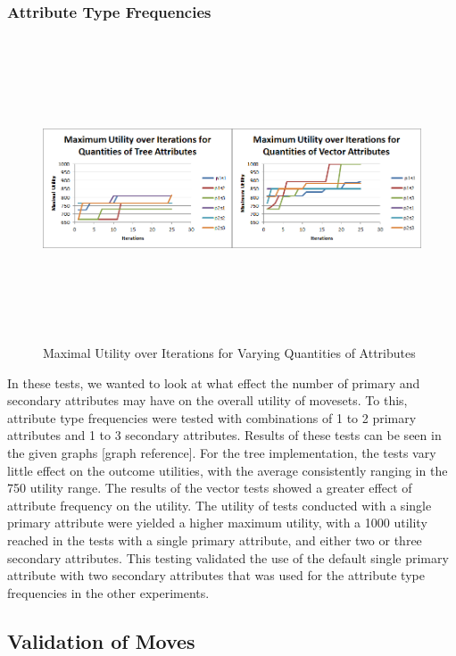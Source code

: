 \documentclass{acm_proc_article-sp}
\begin{document}
    \subsubsection{Attribute Type Frequencies}

\begin{figure}[ht!]
\centering
\includegraphics[width=\textwidth,height=90mm,keepaspectratio]{./images/attr_frquency_comparison.png}
\caption{Maximal Utility over Iterations for Varying Quantities of Attributes}
\label{attribute_frequency_experiments}
\end{figure}

In these tests, we wanted to look at what effect the number of primary and secondary attributes may have on the overall utility of movesets. To this, attribute type frequencies were tested with combinations of 1 to 2 primary attributes and 1 to 3 secondary attributes. Results of these tests can be seen in the given graphs [graph reference]. For the tree implementation, the tests vary little effect on the outcome utilities, with the average consistently ranging in the 750 utility range. The results of the vector tests showed a greater effect of attribute frequency on the utility. The utility of tests conducted with a single primary attribute were yielded a higher maximum utility, with a 1000 utility reached in the tests with a single primary attribute, and either two or three secondary attributes. This testing validated the use of the default single primary attribute with two secondary attributes that was used for the attribute type frequencies in the other experiments.
    
    \subsection{Validation of Moves}
\end{document}
